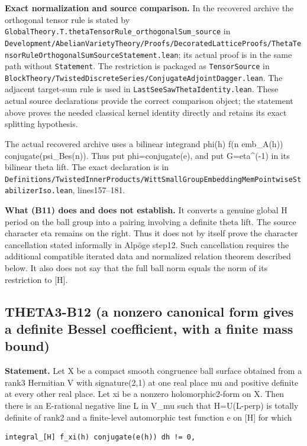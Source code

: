 \textbf{Exact normalization and source comparison.} In the recovered archive the orthogonal tensor rule is stated by \texttt{GlobalTheory.T.thetaTensorRule\_orthogonalSum\_source} in \texttt{Development/AbelianVarietyTheory/Proofs/DecoratedLatticeProofs/ThetaTensorRuleOrthogonalSumSourceStatement.lean}; its actual proof is in the same path without \texttt{Statement}. The restriction is packaged as \texttt{TensorSource} in \texttt{BlockTheory/TwistedDiscreteSeries/ConjugateAdjointDagger.lean}. The adjacent target-sum rule is used in \texttt{LastSeeSawThetaIdentity.lean}. These actual source declarations provide the correct comparison object; the statement above proves the needed classical kernel identity directly and retains its exact splitting hypothesis.

The actual recovered archive uses a bilinear integrand phi(h) f(n emb\_A(h)) conjugate(psi\_Bes(n)). Thus put phi=conjugate(e), and put G=eta\^{}(-1) in its bilinear theta lift. The exact declaration is in \texttt{Definitions/TwistedInnerProducts/WittSmallGroupEmbeddingMemPointwiseStabilizerIso.lean}, lines157--181.

\textbf{What (B11) does and does not establish.} It converts a genuine global H period on the ball group into a pairing involving a definite theta lift. The source character eta remains on the right. Thus it does not by itself prove the character cancellation stated informally in Alpöge step12. Such cancellation requires the additional compatible iterated data and normalized relation theorem described below. It also does not say that the full ball norm equals the norm of its restriction to {[}H{]}.

\subsection{THETA3-B12 (a nonzero canonical form gives a definite Bessel coefficient, with a finite mass bound)}\label{theta3-b12-a-nonzero-canonical-form-gives-a-definite-bessel-coefficient-with-a-finite-mass-bound}\label{B12}

\textbf{Statement.} Let X be a compact smooth congruence ball surface obtained from a rank3 Hermitian V with signature(2,1) at one real place mu and positive definite at every other real place. Let xi be a nonzero holomorphic2-form on X. Then there is an E-rational negative line L in V\_mu such that H=U(L-perp) is totally definite of rank2 and a finite-level automorphic test function e on {[}H{]} for which

\begin{verbatim}
integral_[H] f_xi(h) conjugate(e(h)) dh != 0,
\end{verbatim}


